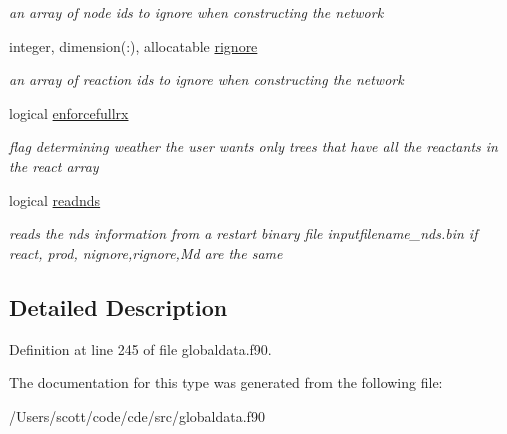 \begin{DoxyCompactItemize}
\begin{DoxyCompactList}\small\item\em an array of node ids to ignore when constructing the network \end{DoxyCompactList}\item 
\mbox{\label{structglobaldata_1_1graphpar_a64ccf3c45273eebc5e65bb5cc1b156c3}} 
integer, dimension(\+:), allocatable \mbox{\hyperlink{structglobaldata_1_1graphpar_a64ccf3c45273eebc5e65bb5cc1b156c3}{rignore}}
\begin{DoxyCompactList}\small\item\em an array of reaction ids to ignore when constructing the network \end{DoxyCompactList}\item 
\mbox{\label{structglobaldata_1_1graphpar_a6b867d599c34e51e0b2fb48d3b96b0c9}} 
logical \mbox{\hyperlink{structglobaldata_1_1graphpar_a6b867d599c34e51e0b2fb48d3b96b0c9}{enforcefullrx}}
\begin{DoxyCompactList}\small\item\em flag determining weather the user wants only trees that have all the reactants in the react array \end{DoxyCompactList}\item 
\mbox{\label{structglobaldata_1_1graphpar_a9d87e51852eb1f8b56308b38f4835ace}} 
logical \mbox{\hyperlink{structglobaldata_1_1graphpar_a9d87e51852eb1f8b56308b38f4835ace}{readnds}}
\begin{DoxyCompactList}\small\item\em reads the nds information from a restart binary file inputfilename\+\_\+nds.\+bin if react, prod, nignore,rignore,Md are the same \end{DoxyCompactList}\end{DoxyCompactItemize}


\subsection{Detailed Description}


Definition at line 245 of file globaldata.\+f90.



The documentation for this type was generated from the following file\+:\begin{DoxyCompactItemize}
\item 
/\+Users/scott/code/cde/src/globaldata.\+f90\end{DoxyCompactItemize}
